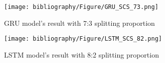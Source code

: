 \documentclass{ieeeojies}
\begin{document}
\begin{figure}[H]
  \centering
  \begin{minipage}{0.8\linewidth}
    \centering
    \texttt{[image: bibliography/Figure/GRU\_SCS\_73.png]}
    \caption{GRU model's result with 7:3 splitting proportion}
    \label{fig8}
  \end{minipage}
\end{figure}

\begin{figure}[H]
  \centering
  \begin{minipage}{0.8\linewidth}
    \centering
    \texttt{[image: bibliography/Figure/LSTM\_SCS\_82.png]}
    \caption{LSTM model's result with 8:2 splitting proportion}
    \label{fig9}
  \end{minipage}
\end{figure}
\end{document}
